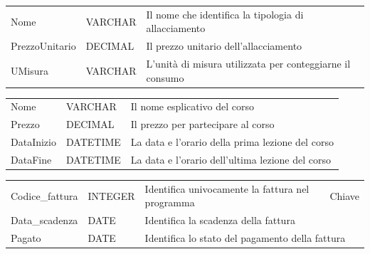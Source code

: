 \begin{center}
    \begin{tabularx}{\textwidth}{|l|l|X|}
        \hline
        \rowcolor{gray!30}
        \multicolumn{3}{|c|}{\textbf{Allacciamento}}\\
        \hline
        Nome & VARCHAR & Il nome che identifica la tipologia di allacciamento\\
        \hline
        PrezzoUnitario & DECIMAL & Il prezzo unitario dell'allacciamento\\
        \hline
        UMisura & VARCHAR & L'unità di misura utilizzata per conteggiarne il consumo\\
        \hline
    \end{tabularx}
\end{center}

\begin{center}
    \begin{tabularx}{\textwidth}{|l|l|X|}
        \hline
        \rowcolor{gray!30}
        \multicolumn{3}{|c|}{\textbf{Corso}}\\
        \hline
        Nome & VARCHAR & Il nome esplicativo del corso \\
        \hline
        Prezzo & DECIMAL & Il prezzo per partecipare al corso\\
        \hline
        DataInizio & DATETIME & La data e l'orario della prima lezione del corso\\
        \hline
        DataFine & DATETIME & La data e l'orario dell'ultima lezione del corso\\
        \hline
    \end{tabularx}
\end{center}

\begin{center}
    \begin{tabularx}{\textwidth}{|l|l|l|X|}
        \hline
        \rowcolor{gray!30}
        \multicolumn{4}{|c|}{\textbf{Fattura}}\\
        \hline
        Codice\_fattura & INTEGER & Identifica univocamente la fattura nel programma & Chiave \\
        \hline
        Data\_scadenza & DATE & \multicolumn{2}{l|}{Identifica la scadenza della fattura} \\
        \hline
        Pagato & DATE & \multicolumn{2}{l|}{Identifica lo stato del pagamento della fattura} \\
        \hline
    \end{tabularx}
\end{center}

